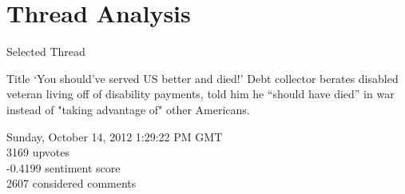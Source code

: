 \documentclass[aspectratio=169,notes]{beamer}
\begin{document}
\section{Thread Analysis}

\begin{frame}{Selected Thread}
\begin{block}{Title}
‘You should’ve served US better and died!’ Debt collector berates disabled veteran living off of disability payments, told him he “should have died” in war instead of "taking advantage of" other Americans.
\end{block}
 Sunday, October 14, 2012 1:29:22 PM GMT\\
 3169 upvotes\\
 -0.4199 sentiment score\\
 2607 considered comments
\end{frame}
\end{document}
